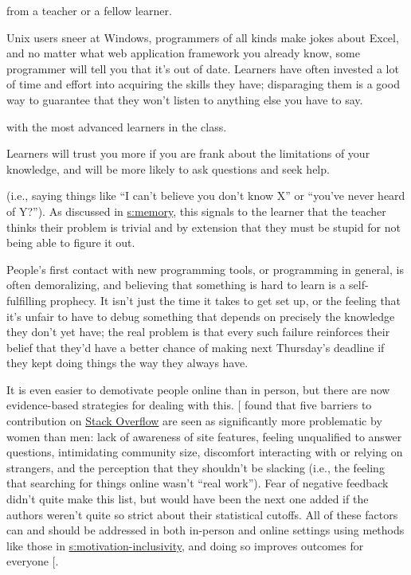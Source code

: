 \begin{description}
\tightlist
\item[A holier-than-thou or contemptuous attitude]
from a teacher or a fellow learner.
\item[Telling them that their existing skills are rubbish.]
Unix users sneer at Windows, programmers of all kinds make jokes
about Excel, and no matter what web application framework you
already know, some programmer will tell you that it's out of date.
Learners have often invested a lot of time and effort into acquiring
the skills they have; disparaging them is a good way to guarantee
that they won't listen to anything else you have to say.
\item[Diving into complex or detailed technical discussion]
with the most advanced learners in the class.
\item[Pretending that you know more than you do.]
Learners will trust you more if you are frank about the limitations
of your knowledge, and will be more likely to ask questions and seek
help.
\item[Using the J word (``just'') or feigning surprise]
(i.e., saying things like ``I can't believe you don't know X'' or
``you've never heard of Y?''). As discussed in
\protect\hyperlink{CHAPTER}{s:memory}, this signals to the learner that the teacher
thinks their problem is trivial and by extension that they must be
stupid for not being able to figure it out.
\item[Software installation headaches.]
People's first contact with new programming tools, or programming in
general, is often demoralizing, and believing that something is hard
to learn is a self-fulfilling prophecy. It isn't just the time it
takes to get set up, or the feeling that it's unfair to have to
debug something that depends on precisely the knowledge they don't
yet have; the real problem is that every such failure reinforces
their belief that they'd have a better chance of making next
Thursday's deadline if they kept doing things the way they always
have.
\end{description}

It is even easier to demotivate people online than in person, but
there are now evidence-based strategies for dealing with this.
{[}\protect[\hyperlink{b:Ford2016}{Ford2016}]{]} found that five barriers to contribution on \href{https://stackoverflow.com/}{Stack
Overflow} are seen as significantly more problematic
by women than men: lack of awareness of site features, feeling
unqualified to answer questions, intimidating community size,
discomfort interacting with or relying on strangers, and the
perception that they shouldn't be slacking (i.e., the feeling that
searching for things online wasn't ``real work''). Fear of negative
feedback didn't quite make this list, but would have been the next one
added if the authors weren't quite so strict about their statistical
cutoffs. All of these factors can and should be addressed in both
in-person and online settings using methods like those in
\protect\hyperlink{SECTION}{s:motivation-inclusivity}, and doing so improves outcomes
for everyone {[}\protect[\hyperlink{b:Sved2016}{Sved2016}]{]}.

